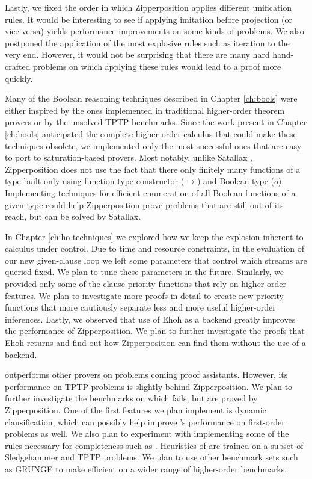 Lastly, we fixed the order in which Zipperposition applies different unification
rules. It would be interesting to see if applying imitation before projection
(or vice versa) yields performance improvements on some kinds of problems. 
We also postponed the application of the most explosive rules such as iteration
to the very end. However, it would not be surprising that there are many hard hand-crafted
problems on which applying these rules would lead to a proof more quickly.

 Many of the Boolean reasoning
techniques described in Chapter \ref{ch:bools} were either inspired by the ones
implemented in traditional higher-order theorem provers or by the unsolved TPTP
benchmarks. Since the work present in Chapter \ref{ch:bools} anticipated the
complete higher-order calculus that could make these techniques obsolete, we
implemented only the most successful ones that are easy to port to
saturation-based provers.  Most notably, unlike Satallax
\cite{cb-2013-satallax}, Zipperposition does not use the fact that there only
finitely many functions of a type built only using function type constructor
($\rightarrow$) and Boolean type ($o$). Implementing techniques for efficient
enumeration of all Boolean functions of a given type could help Zipperposition
prove problems that are still out of its reach, but can be solved by Satallax.

In Chapter \ref{ch:ho-techniques} we explored how we keep the explosion inherent
to \osup{} calculus under control. Due to time and resource
constraints, in the evaluation of our new given-clause loop we left some
parameters that control which streams are queried fixed. We plan to tune these
parameters in the future.  Similarly, we provided only some of the clause
priority functions that rely on higher-order features. We plan to investigate
more proofs in detail to create new priority functions that more cautiously
separate less and more useful higher-order inferences. Lastly, we observed that
use of Ehoh as a backend greatly improves the performance of Zipperposition. We
plan to further investigate the proofs that Ehoh returns and find out how
Zipperposition can find them without the use of a backend.

 \ehohii{} outperforms other provers on
problems coming proof assistants. However, its performance on TPTP problems is
slightly behind Zipperposition. We plan to further investigate the benchmarks on
which \ehohii{} fails, but are proved by Zipperposition. One of the first
features we plan implement is dynamic clausification, which can possibly help
improve \ehohii{}'s performance on first-order problems as well. We also plan to
experiment with implementing some of the \osup{} rules necessary for
completeness such as . Heuristics of \ehohii{} are trained on
a subset of Sledgehammer and TPTP problems. We plan to use other benchmark sets
such as GRUNGE to make \ehohii{} efficient on a wider range of higher-order
benchmarks.


